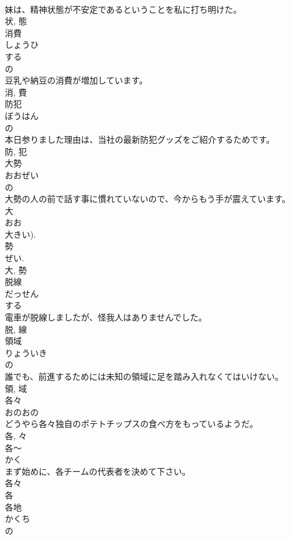 \documentclass[8pt]{extreport}
\begin{document}
\begin{CJK}{UTF8}{min}
\\	妹は、精神状態が不安定であるということを私に打ち明けた。	
\\	状, 態	
\\	消費	
\\	しょうひ	
\\	する 
\\	の 
\\	豆乳や納豆の消費が増加しています。	
\\	消, 費	
\\	防犯	
\\	ぼうはん	
\\	の 
\\	本日参りました理由は、当社の最新防犯グッズをご紹介するためです。	
\\	防, 犯	
\\	大勢	
\\	おおぜい	
\\	の 
\\	大勢の人の前で話す事に慣れていないので、今からもう手が震えています。	
\\	大 
\\	おお 
\\	大きい). 
\\	勢 
\\	ぜい. 
\\	大, 勢	
\\	脱線	
\\	だっせん	
\\	する 
\\	電車が脱線しましたが、怪我人はありませんでした。	
\\	脱, 線	
\\	領域	
\\	りょういき	
\\	の 
\\	誰でも、前進するためには未知の領域に足を踏み入れなくてはいけない。	
\\	領, 域	
\\	各々	
\\	おのおの	
\\	どうやら各々独自のポテトチップスの食べ方をもっているようだ。	
\\	各, 々	
\\	各〜	
\\	かく	
\\	まず始めに、各チームの代表者を決めて下さい。	
\\	各々 
\\	各	
\\	各地	
\\	かくち	
\\	の 

\end{CJK}
\end{document}
